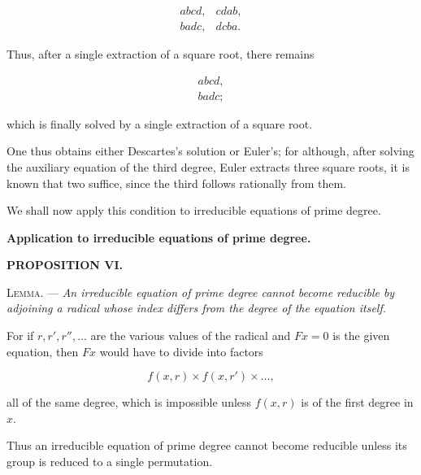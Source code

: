 \[
\begin{array}{ll}
  abcd, & cdab,  \\
  badc, & dcba.
\end{array}
\]

Thus, after a single extraction of a square root, there remains

\[
\begin{array}{l}
  abcd,  \\
  badc;
\end{array}
\]

which is finally solved by a single extraction of a square root.

One thus obtains either Descartes's solution or Euler's; for although, after
solving the auxiliary equation of the third degree, Euler extracts three square
roots, it is known that two suffice, since the third follows rationally from
them.

We shall now apply this condition to irreducible equations of prime degree.


\begin{center}
{\large\bfseries Application to irreducible equations of prime degree.}
\end{center}

\begin{center}{\bfseries PROPOSITION VI.}\end{center}

\noindent\textsc{Lemma.} --- {\itshape An irreducible equation of prime degree cannot
become reducible by adjoining a radical whose index differs from the degree of
the equation itself.}

For if $r,r',r'',\ldots$ are the various values of the radical and $Fx=0$ is
the given equation, then $Fx$ would have to divide into factors

\[
f(x,r)\times f(x,r')\times\ldots,
\]

all of the same degree, which is impossible unless $f(x,r)$ is of the first
degree in $x$.

Thus an irreducible equation of prime degree cannot become reducible unless
its group is reduced to a single permutation.

